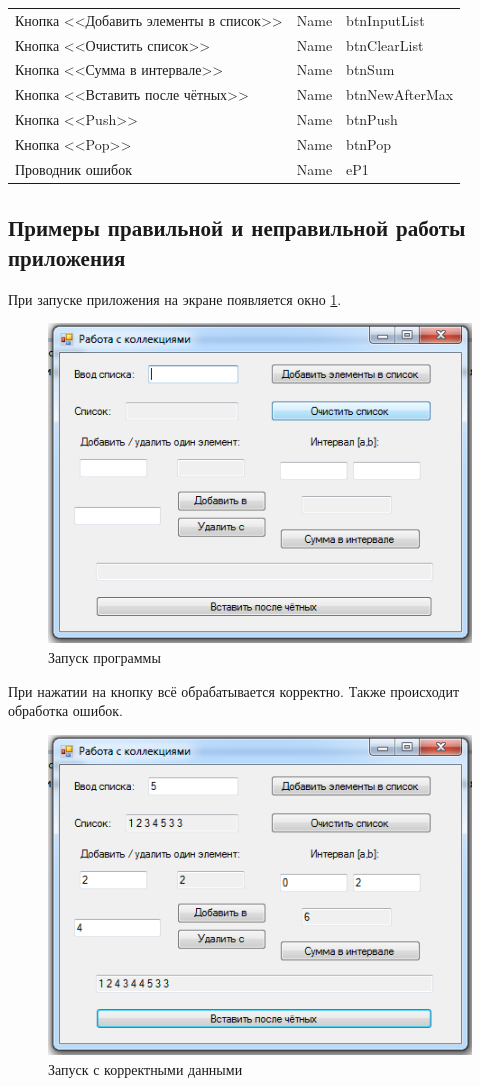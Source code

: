 \begin{xltabular}{\textwidth}{| m{0.3\textwidth} | m{0.3\textwidth} | m{0.3\textwidth} |}
Кнопка <<Добавить элементы в список>> & Name & btnInputList \\
Кнопка <<Очистить список>> & Name & btnClearList \\
Кнопка <<Сумма в интервале>> & Name & btnSum \\
Кнопка <<Вставить после чётных>> & Name & btnNewAfterMax \\
Кнопка <<Push>> & Name & btnPush \\
Кнопка <<Pop>> & Name & btnPop \\
Проводник ошибок & Name & eP1 \\
\end{xltabular}


\subsection{Примеры правильной и неправильной работы приложения}
При запуске приложения на экране появляется окно \ref{fig:collections-start}.

\begin{figure}
\centering
\includegraphics[width=0.5\linewidth]{images//collections/start.png}
\caption{Запуск программы}
\label{fig:collections-start}
\end{figure}

При нажатии на кнопку всё обрабатывается корректно. Также происходит обработка ошибок.

\begin{figure}
\centering
\includegraphics[width=0.5\linewidth]{images//collections/okay.png}
\caption{Запуск с корректными данными}
\label{fig:collections-okay}
\end{figure}

